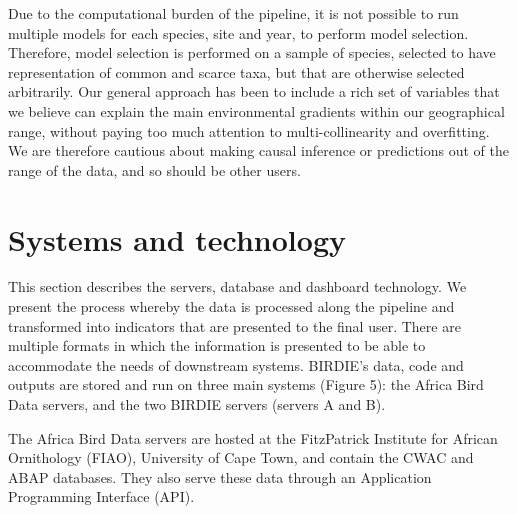 \documentclass[utf8]{frontiersSCNS}
\begin{document}
Due to the computational burden of the pipeline, it is not possible to
run multiple models for each species, site and year, to perform model
selection. Therefore, model selection is performed on a sample of
species, selected to have representation of common and scarce taxa, but
that are otherwise selected arbitrarily. Our general approach has been
to include a rich set of variables that we believe can explain the main
environmental gradients within our geographical range, without paying
too much attention to multi-collinearity and overfitting. We are
therefore cautious about making causal inference or predictions out of
the range of the data, and so should be other users.

\hypertarget{systems-and-technology}{%
\section*{Systems and technology}\label{systems-and-technology}}

This section describes the servers, database and dashboard technology.
We present the process whereby the data is processed along the pipeline
and transformed into indicators that are presented to the final user.
There are multiple formats in which the information is presented to be
able to accommodate the needs of downstream systems. BIRDIE's data, code
and outputs are stored and run on three main systems (Figure 5): the
Africa Bird Data servers, and the two BIRDIE servers (servers A and B).

The Africa Bird Data servers are hosted at the FitzPatrick Institute for
African Ornithology (FIAO), University of Cape Town, and contain the
CWAC and ABAP databases. They also serve these data through an
Application Programming Interface (API).
\end{document}
